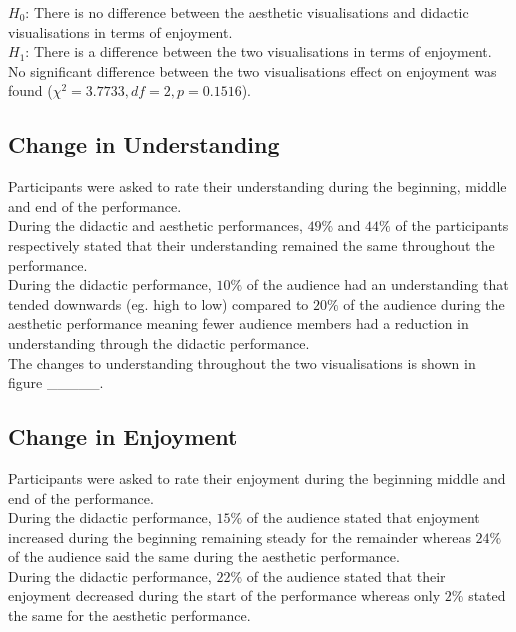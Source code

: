\documentclass[12pt]{article}
\begin{document}
$H_0$: There is no difference between the aesthetic visualisations and didactic visualisations in terms of enjoyment.\\
$H_1$: There is a difference between the two visualisations in terms of enjoyment.\\

No significant difference between the two visualisations effect on enjoyment was found ($\chi^2=3.7733,df=2,p=0.1516$).

\subsection{Change in Understanding}

Participants were asked to rate their understanding during the beginning, middle and end of the performance.\\

During the didactic and aesthetic performances, $49\%$ and $44\%$ of the participants respectively stated that their understanding remained the same throughout the performance.\\

During the didactic performance, $10\%$ of the audience had an understanding that tended downwards (eg. high to low) compared to $20\%$ of the audience during the aesthetic performance meaning fewer audience members had a reduction in understanding through the didactic performance.\\

The changes to understanding throughout the two visualisations is shown in figure \_\_\_\_\_.

\subsection{Change in Enjoyment}

Participants were asked to rate their enjoyment during the beginning middle and end of the performance.\\

During the didactic performance, $15\%$ of the audience stated that enjoyment increased during the beginning remaining steady for the remainder whereas $24\%$ of the audience said the same during the aesthetic performance.\\

During the didactic performance, $22\%$ of the audience stated that their enjoyment decreased during the start of the performance whereas only $2\%$ stated the same for the aesthetic performance.\\
\end{document}

